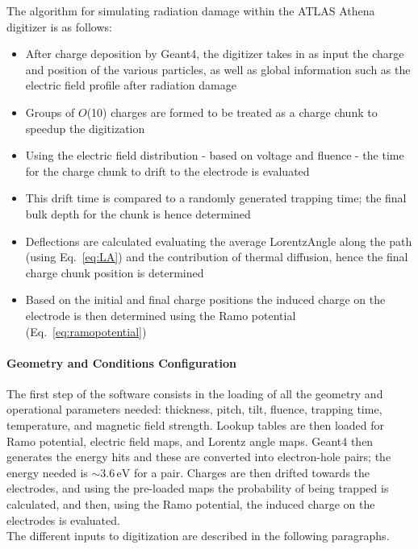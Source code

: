 The algorithm for simulating radiation damage within the ATLAS Athena digitizer is as follows:

\begin{itemize}
\item{After charge deposition by Geant4, the digitizer takes in as input the charge and position of the various particles, as well as global information such as the electric field profile after radiation damage}
\item{Groups of $O$(10) charges are formed to be treated as a charge chunk to speedup the digitization}
\item{Using the electric field distribution - based on voltage and fluence - the time for the charge chunk to drift to 
the electrode is evaluated}
\item{This drift time is compared to a randomly generated trapping time; the final bulk depth for the chunk is hence determined}
\item{Deflections are calculated evaluating the average LorentzAngle along the path (using Eq.~\ref{eq:LA}) and 
the contribution of thermal diffusion, hence the final charge chunk position is determined}
\item{ Based on the initial and final charge positions the induced charge on the electrode is then determined using the  Ramo potential (Eq.~\ref{eq:ramopotential}) }
\end{itemize}


\paragraph*{Geometry and Conditions Configuration}
The first step of the software consists in the loading of all the geometry and operational parameters needed: thickness, pitch, tilt, fluence, trapping time, temperature, and magnetic field strength. Lookup tables are then loaded for Ramo potential, electric field maps, and Lorentz angle maps.
Geant4 then generates the energy hits and these are converted into electron-hole pairs; the energy needed is  $\sim 3.6\, \textrm{eV}$ for a pair. 
Charges are then drifted towards the electrodes, and using the pre-loaded maps the probability of being trapped is calculated, and then, using the Ramo potential, the induced charge on the electrodes is evaluated. \\
The different inputs to digitization are described in the following paragraphs.


